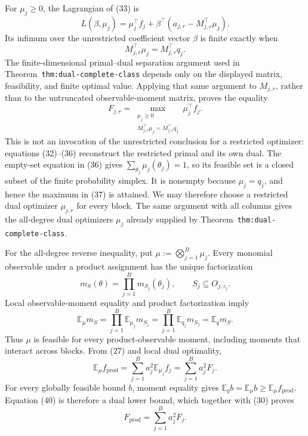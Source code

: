 For \(\mu_j\ge0\), the Lagrangian of (33) is
\[
L(\beta,\mu_j)
=\mu_j^{\top}f_j
+\beta^{\top}(a_{j,r}-M_{j,r}^{\top}\mu_j).
\tag{35}
\]
Its infimum over the unrestricted coefficient vector \(\beta\) is finite exactly when
\[
M_{j,r}^{\top}\mu_j=M_{j,r}^{\top}q_j.
\tag{36}
\]
The finite-dimensional primal--dual separation argument used in Theorem~\texttt{thm:dual-complete-class} depends only on the displayed matrix, feasibility, and finite optimal value.  Applying that same argument to \(M_{j,r}\), rather than to the untruncated observable-moment matrix, proves the equality
\[
F_{j,r}
=\max_{\substack{\mu_j\ge0\\
M_{j,r}^{\top}\mu_j=M_{j,r}^{\top}q_j}}
\mu_j^{\top}f_j.
\tag{37}
\]
This is not an invocation of the unrestricted conclusion for a restricted optimizer: equations (32)--(36) reconstruct the restricted primal and its own dual.  The empty-set equation in (36) gives \(\sum_{\theta_j}\mu_j(\theta_j)=1\), so its feasible set is a closed subset of the finite probability simplex.  It is nonempty because \(\mu_j=q_j\), and hence the maximum in (37) is attained.  We may therefore choose a restricted dual optimizer \(\mu_{j,r}\) for every block.  The same argument with all columns gives the all-degree dual optimizers \(\mu_j\) already supplied by Theorem~\texttt{thm:dual-complete-class}.

For the all-degree reverse inequality, put \(\mu:=\bigotimes_{j=1}^B\mu_j\).  Every monomial observable under a product assignment has the unique factorization
\[
m_S(\theta)=\prod_{j=1}^Bm_{S_j}(\theta_j),
\qquad
S_j\subseteq O_{j,z_j}.
\tag{38}
\]
Local observable-moment equality and product factorization imply
\[
\mathbb E_\mu m_S
=\prod_{j=1}^B\mathbb E_{\mu_j}m_{S_j}
=\prod_{j=1}^B\mathbb E_{q_j}m_{S_j}
=\mathbb E_qm_S.
\tag{39}
\]
Thus \(\mu\) is feasible for every product-observable moment, including moments that interact across blocks.  From (27) and local dual optimality,
\[
\mathbb E_\mu f_{\mathrm{prod}}
=\sum_{j=1}^Ba_j^2\mathbb E_{\mu_j}f_j
=\sum_{j=1}^Ba_j^2F_j.
\tag{40}
\]
For every globally feasible bound \(b\), moment equality gives \(\mathbb E_qb=\mathbb E_\mu b\ge\mathbb E_\mu f_{\mathrm{prod}}\).  Equation (40) is therefore a dual lower bound, which together with (30) proves
\[
F_{\mathrm{prod}}=\sum_{j=1}^Ba_j^2F_j.
\tag{41}
\]

